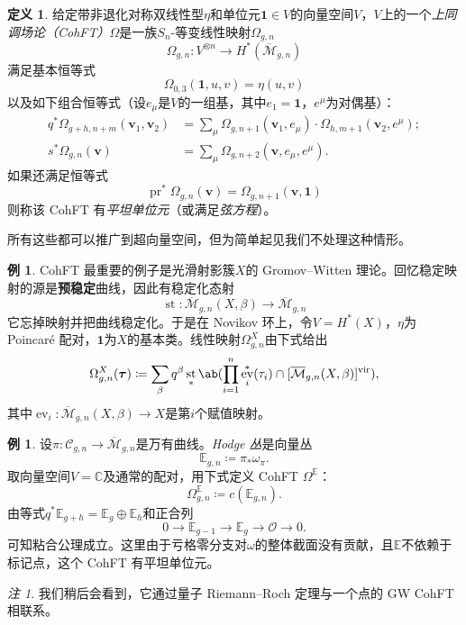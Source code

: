 \documentclass{amsart}
\theoremstyle{definition}
\newtheorem{defn}[thm]{定义}
\newtheorem{exm}[thm]{例}
\theoremstyle{remark}
\newtheorem{rmk}[thm]{注}
\theoremstyle{plain}
\theoremstyle{definition}
\theoremstyle{remark}
\newcommand{\C}{\mathbb{C}}
\newcommand{\E}{\mathbb{E}}
\newcommand{\Mbar}{\overline{\mathcal{M}}}
\newcommand{\mc}[1]{\mathcal{#1}}
\newcommand{\mbf}[1]{\mathbf{#1}}
\newcommand{\bv}{\mbf{v}}
\newcommand{\btau}{\bm{\tau}}
\newcommand{\mr}[1]{\mathrm{#1}}
\newcommand{\1}{\mathbf{1}}
\newcommand{\2}{\mathbf{2}}
\newcommand{\3}{\mathbf{3}}
\newcommand{\vir}{\mr{vir}}
\DeclareMathOperator{\ev}{ev}
\DeclareMathOperator{\st}{st}
\DeclareMathOperator{\pr}{pr}
\begin{document}
\begin{defn}
    给定带非退化对称双线性型$\eta$和单位元$\1 \in V$的向量空间$V$，$V$上的一个\textit{上同调场论（CohFT）}$\Omega$是一族$S_n$-等变线性映射$\Omega_{g,n}$
    \[ \Omega_{g,n} \colon V^{\otimes n} \to H^*(\Mbar_{g,n}) \]
    满足基本恒等式
    \[ \Omega_{0,3}(\1, u,v) = \eta(u,v) \]
    以及如下组合恒等式（设$e_{\mu}$是$V$的一组基，其中$e_1 = \1$，$e^{\mu}$为对偶基）：
    \begin{align*}
        q^* \Omega_{g+h,n+m}(\bv_1, \bv_2) &= \sum_{\mu} \Omega_{g,n+1}(\bv_1, e_{\mu}) \cdot \Omega_{h,m+1}(  \bv_2, e^{\mu} ); \\
        s^* \Omega_{g,n}(\bv) &= \sum_{\mu} \Omega_{g,n+2}(\bv, e_{\mu}, e^{\mu}).
    \end{align*}
    如果还满足恒等式
    \[ \pr^*\Omega_{g,n}(\bv) = \Omega_{g,n+1}(\bv,\1) \]
    则称该 CohFT 有\textit{平坦单位元}（或满足\textit{弦方程}）。
\end{defn}
所有这些都可以推广到超向量空间，但为简单起见我们不处理这种情形。

\begin{exm}
    CohFT 最重要的例子是光滑射影簇$X$的 Gromov--Witten 理论。回忆稳定映射的源是\textbf{预稳定}曲线，因此有稳定化态射
    \[ \st \colon \Mbar_{g,n}(X,\beta) \to \Mbar_{g,n} \]
    它忘掉映射并把曲线稳定化。于是在 Novikov 环上，令$V = H^*(X)$，$\eta$为 Poincar\'e 配对，$\1$为$X$的基本类。线性映射$\Omega^X_{g,n}$由下式给出
    \[ \Omega_{g,n}^X(\btau) \coloneqq \sum_{\beta} q^{\beta} \st_* \ab(\prod_{i=1}^n \ev_i^*(\tau_i) \cap [\Mbar_{g,n}(X,\beta)]^{\vir}), \]
    其中$\ev_i \colon \Mbar_{g,n}(X,\beta) \to X$是第$i$个赋值映射。
\end{exm}

\begin{exm}
    设$\pi \colon \mc{C}_{g,n} \to \Mbar_{g,n}$是万有曲线。\textit{Hodge 丛}是向量丛
    \[ \E_{g,n} \coloneqq \pi_* \omega_{\pi}. \]
    取向量空间$V = \C$及通常的配对，用下式定义 CohFT $\Omega^{\E}$：
    \[ \Omega^{\E}_{g,n} \coloneqq c(\E_{g,n}). \]
    由等式$q^* \E_{g+h} = \E_g \oplus \E_h$和正合列
    \[ 0 \to \E_{g-1} \to \E_g \to \mc{O} \to 0. \]
    可知粘合公理成立。这里由于亏格零分支对$\omega$的整体截面没有贡献，且$\E$不依赖于标记点，这个 CohFT 有平坦单位元。
\end{exm}

\begin{rmk}
    我们稍后会看到，它通过量子 Riemann--Roch 定理与一个点的 GW CohFT 相联系。
\end{rmk}
\end{document}
